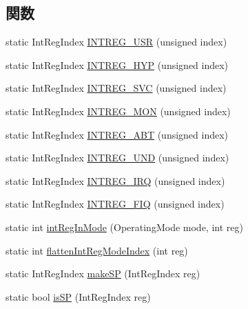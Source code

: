 \subsection*{関数}
\begin{DoxyCompactItemize}
\item 
static IntRegIndex \hyperlink{namespaceArmISA_afcf51b62b293f8265519c2c1f0aa763b}{INTREG\_\-USR} (unsigned index)
\item 
static IntRegIndex \hyperlink{namespaceArmISA_a1ed0993c3868062aa01eac54ef9c26f0}{INTREG\_\-HYP} (unsigned index)
\item 
static IntRegIndex \hyperlink{namespaceArmISA_a80b294215a228696fd380d538824e2e3}{INTREG\_\-SVC} (unsigned index)
\item 
static IntRegIndex \hyperlink{namespaceArmISA_a9b7e821f71bd0f07e3379b5f6c20191d}{INTREG\_\-MON} (unsigned index)
\item 
static IntRegIndex \hyperlink{namespaceArmISA_acf41a748939193489ce8060a12a4e156}{INTREG\_\-ABT} (unsigned index)
\item 
static IntRegIndex \hyperlink{namespaceArmISA_a8eb60ace4091dc891b1af3d4a2d29a2d}{INTREG\_\-UND} (unsigned index)
\item 
static IntRegIndex \hyperlink{namespaceArmISA_a31a9edd8c4d9b73d6b0e98a37c4aad74}{INTREG\_\-IRQ} (unsigned index)
\item 
static IntRegIndex \hyperlink{namespaceArmISA_a69779ea18ee35b2b4da8e2da6dfc5df2}{INTREG\_\-FIQ} (unsigned index)
\item 
static int \hyperlink{namespaceArmISA_ae0b6544f6aae9f75f1a985b3c947100a}{intRegInMode} (OperatingMode mode, int reg)
\item 
static int \hyperlink{namespaceArmISA_a5145cdbf9c033da6bf91afd54198ae2f}{flattenIntRegModeIndex} (int reg)
\item 
static IntRegIndex \hyperlink{namespaceArmISA_af91dabb3b6fd9b8ed4e27d5bccaeb563}{makeSP} (IntRegIndex reg)
\item 
static bool \hyperlink{namespaceArmISA_a83caf036b07c97d2eba6a475430ceeb7}{isSP} (IntRegIndex reg)
\end{DoxyCompactItemize}
